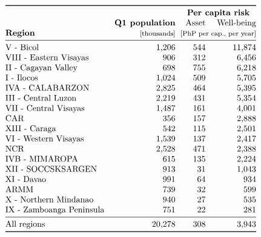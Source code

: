 \documentclass[10pt]{article}
\begin{document}
\[\begin{tabular}{@{}lrrr@{}}
\toprule
& & \multicolumn{2}{c}{\bf Per capita risk}\\
{} &  \bf Q1 population &  Asset &  Well-being \\
\bf Region  & \footnotesize [thousands]  &  \multicolumn{2}{@{}c@{}}{\footnotesize [PhP per cap., per year]}\\
\midrule
V - Bicol                &  1,206 &         544 &      11,874 \\
VIII - Eastern Visayas   &    906 &         312 &       6,456 \\
II - Cagayan Valley      &    698 &         755 &       6,218 \\
I - Ilocos               &  1,024 &         509 &       5,705 \\
IVA - CALABARZON         &  2,825 &         464 &       5,395 \\
III - Central Luzon      &  2,219 &         431 &       5,354 \\
VII - Central Visayas    &  1,487 &         161 &       4,001 \\
CAR                      &    356 &         157 &       2,888 \\
XIII - Caraga            &    542 &         115 &       2,501 \\
VI - Western Visayas     &  1,539 &         137 &       2,417 \\
NCR                      &  2,528 &         471 &       2,388 \\
IVB - MIMAROPA           &    615 &         135 &       2,224 \\
XII - SOCCSKSARGEN       &    913 &          31 &       1,043 \\
XI - Davao               &    991 &          64 &         934 \\
ARMM                     &    739 &          32 &         599 \\
X - Northern Mindanao    &    940 &          27 &         535 \\
IX - Zamboanga Peninsula &    751 &          22 &         281 \\
\midrule
All regions            &  20,278 &        308 &       3,943 \\
\bottomrule
\end{tabular}\]
\end{document}
